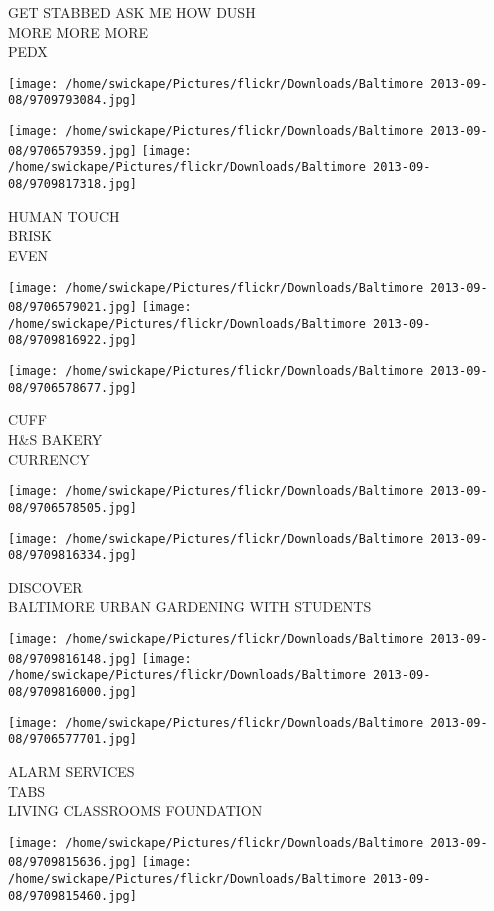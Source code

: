 \documentclass[10pt,letterpaper]{article}
\begin{document}
GET STABBED ASK ME HOW DUSH\\
MORE MORE MORE\\
PEDX
\pagebreak

\texttt{[image: /home/swickape/Pictures/flickr/Downloads/Baltimore 2013-09-08/9709793084.jpg]}

\vspace{0.25in}
\texttt{[image: /home/swickape/Pictures/flickr/Downloads/Baltimore 2013-09-08/9706579359.jpg]}
\texttt{[image: /home/swickape/Pictures/flickr/Downloads/Baltimore 2013-09-08/9709817318.jpg]}

HUMAN TOUCH\\
BRISK\\
EVEN
\pagebreak

\texttt{[image: /home/swickape/Pictures/flickr/Downloads/Baltimore 2013-09-08/9706579021.jpg]}
\texttt{[image: /home/swickape/Pictures/flickr/Downloads/Baltimore 2013-09-08/9709816922.jpg]}

\texttt{[image: /home/swickape/Pictures/flickr/Downloads/Baltimore 2013-09-08/9706578677.jpg]}

CUFF\\
H\&S BAKERY\\
CURRENCY
\pagebreak

\texttt{[image: /home/swickape/Pictures/flickr/Downloads/Baltimore 2013-09-08/9706578505.jpg]}

\vspace{0.25in}
\texttt{[image: /home/swickape/Pictures/flickr/Downloads/Baltimore 2013-09-08/9709816334.jpg]}

DISCOVER\\
BALTIMORE URBAN GARDENING WITH STUDENTS
\pagebreak

\texttt{[image: /home/swickape/Pictures/flickr/Downloads/Baltimore 2013-09-08/9709816148.jpg]}
\texttt{[image: /home/swickape/Pictures/flickr/Downloads/Baltimore 2013-09-08/9709816000.jpg]}

\vspace{0.25in}
\texttt{[image: /home/swickape/Pictures/flickr/Downloads/Baltimore 2013-09-08/9706577701.jpg]}

ALARM SERVICES\\
TABS\\
LIVING CLASSROOMS FOUNDATION
\pagebreak

\texttt{[image: /home/swickape/Pictures/flickr/Downloads/Baltimore 2013-09-08/9709815636.jpg]}
\texttt{[image: /home/swickape/Pictures/flickr/Downloads/Baltimore 2013-09-08/9709815460.jpg]}
\end{document}
